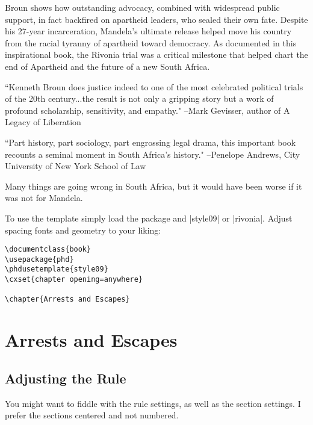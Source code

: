 Broun shows how outstanding advocacy, combined with widespread public support, in fact backfired on apartheid leaders, who sealed their own fate. Despite his 27-year incarceration, Mandela's ultimate release helped move his country from the racial tyranny of apartheid toward democracy. As documented in this inspirational book, the Rivonia trial was a critical milestone that helped chart the end of Apartheid and the future of a new South Africa.

``Kenneth Broun does justice indeed to one of the most celebrated political trials of the 20th century...the result is not only a gripping story but a work of profound scholarship, sensitivity, and empathy." --Mark Gevisser, author of A Legacy of Liberation 

``Part history, part sociology, part engrossing legal drama, this important book recounts a seminal moment in South Africa's history." --Penelope Andrews, City University of New York School of Law

Many things are going wrong in South Africa, but it would have been worse if it was not for Mandela.  

To use the template simply load the  package and |style09| or |rivonia|. Adjust spacing fonts and geometry to your liking:

\begin{verbatim}
\documentclass{book}
\usepackage{phd}
\phdusetemplate{style09}
\cxset{chapter opening=anywhere}

\chapter{Arrests and Escapes}

\end{verbatim}


\chapter{Arrests and Escapes}

\lorem

\section{Adjusting the Rule}

You might want to fiddle with the rule settings, as well as the section settings. I prefer the sections centered and not numbered.

\thispagestyle{headings}








